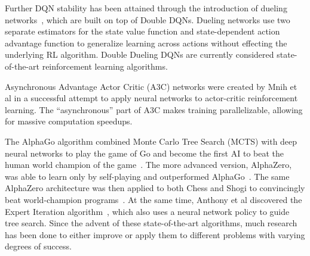 \documentclass[letterpaper]{article} %
\begin{document}
Further DQN stability has been attained through the introduction of dueling networks~\cite{wang2016dueling}, which are built on top of Double DQNs. Dueling networks use two separate estimators for the state value function and state-dependent action advantage function to generalize learning across actions without effecting the underlying RL algorithm. Double Dueling DQNs are currently considered state-of-the-art reinforcement learning algorithms.

Asynchronous Advantage Actor Critic (A3C) networks were created by Mnih et al in a successful attempt to apply neural networks to actor-critic reinforcement learning. The ``asynchronous'' part of A3C makes training parallelizable, allowing for massive computation speedups.

The AlphaGo algorithm combined Monte Carlo Tree Search (MCTS) with deep neural networks to play the game of Go and become the first AI to beat the human world champion of the game~\cite{silver2016mastering}.
The more advanced version, AlphaZero, was able to learn only by self-playing and outperformed AlphaGo~\cite{silver2017mastering}. The same AlphaZero architecture was then applied to both Chess and Shogi to convincingly beat world-champion programs~\cite{silver2017masteringchess}.
At the same time, Anthony et al discovered the Expert Iteration algorithm~\cite{anthony2017thinking}, which also uses a neural network policy to guide tree search. Since the advent of these state-of-the-art algorithms, much research has been done to either improve or apply them to different problems with varying degrees of success.
\end{document}
